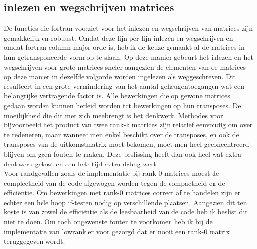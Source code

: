 \documentclass[a4paper]{article}
\begin{document}
\subsection*{inlezen en wegschrijven matrices}

De functies die fortran voorziet voor het inlezen en wegschrijven van matrices zijn gemakkelijk en robuust. Omdat deze lijn per lijn inlezen en wegschrijven en omdat fortran column-major orde is, heb ik de keuze gemaakt al de matrices in hun getransponeerde vorm op te slaan. Op deze manier gebeurt het inlezen en het wegschrijven voor grote matrices sneler aangezien de elementen van de matrices op deze manier in dezelfde volgorde worden ingelezen als weggeschreven. Dit resulteert in een grote vermindering van het aantal geheugentoegangen wat een belangrijke vertragende factor is. Alle bewerkingen die op gewone matrices gedaan worden kunnen herleid worden tot bewerkingen op hun transposes. De moeilijkheid die dit met zich meebrengt is het denkwerk. Methodes voor bijvoorbeeld het product van twee rank-k matrices zijn relatief eenvoudig om over te redeneren, maar wanneer men enkel beschikt over de transposes, en ook de transposes van de uitkomstmatrix moet bekomen, moet men heel geconcentreerd blijven om geen fouten te maken. Deze beslissing heeft dan ook heel wat extra denkwerk gekost en een hele tijd extra debug werk. \\
Voor randgevallen zoals de implementatie bij rank-0 matrices moest de compleetheid van de code afgewogen worden tegen de compactheid en de effici\"entie. Om bewerkingen met rank-0 matrices correct af te handelen zijn er echter een hele hoop if-testen nodig op verschillende plaatsen. Aangezien dit ten koste is van zowel de effici\"entie als de leesbaarheid van de code heb ik beslist dit niet te doen. Om toch ongewenste fouten te voorkomen heb ik bij de implementatie van lowrank er voor gezorgd dat er nooit een rank-0 matrix teruggegeven wordt.
\end{document}
